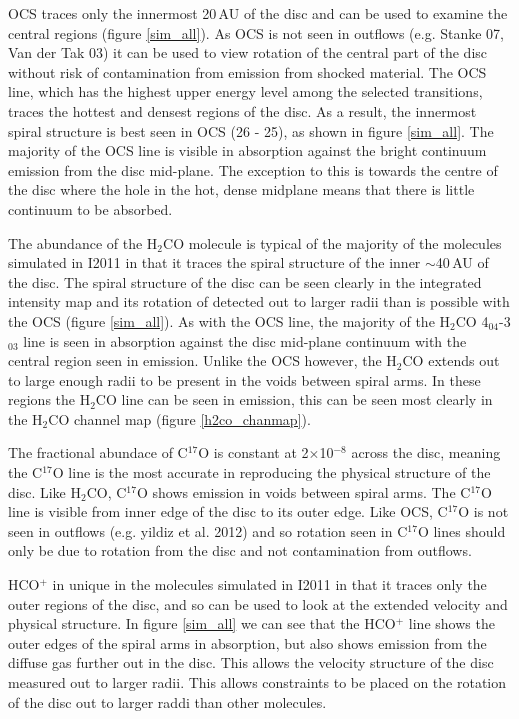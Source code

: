 \documentclass[useAMS,usenatbib]{mn2e}
\begin{document}
OCS traces only the innermost 20$\,$AU of the disc and can be used to examine the central regions (figure \ref{sim_all}). As OCS is not seen in outflows (e.g. Stanke 07, Van der Tak 03) it can be used to view rotation of the central part of the disc without risk of contamination from emission from shocked material. The OCS line, which has the highest upper energy level among the selected transitions, traces the hottest and densest regions of the disc. As a result, the innermost spiral structure is best seen in OCS (26 - 25), as shown in figure \ref{sim_all}. The majority of the OCS line is visible in absorption against the bright continuum emission from the disc mid-plane. The exception to this is towards the centre of the disc where the hole in the hot, dense midplane means that there is little continuum to be absorbed.\newline

The abundance of the H$_2$CO molecule is typical of the majority of the molecules simulated in I2011 in that it traces the spiral structure of the inner $\sim$40$\,$AU of the disc. The spiral structure of the disc can be seen clearly in the integrated intensity map and its rotation of detected out to larger radii than is possible with the OCS (figure \ref{sim_all}). As with the OCS line, the majority of the H$_2$CO 4$_{04}$-3$_{03}$ line is seen in absorption against the disc mid-plane continuum with the central region seen in emission. Unlike the OCS however, the H$_2$CO extends out to large enough radii to be present in the voids between spiral arms. In these regions the H$_2$CO line can be seen in emission, this can be seen most clearly in the H$_2$CO channel map (figure \ref{h2co_chanmap}).\newline

The fractional abundace of C$^{17}$O is constant at 2$\times$10$^{-8}$ across the disc, meaning the C$^{17}$O line is the most accurate in reproducing the physical structure of the disc. Like H$_2$CO, C$^{17}$O shows emission in voids between spiral arms. The C$^{17}$O line is visible from inner edge of the disc to its outer edge. Like OCS, C$^{17}$O is not seen in outflows (e.g. yildiz et al. 2012) and so rotation seen in C$^{17}$O lines should only be due to rotation from the disc and not contamination from outflows.\newline

HCO$^+$ in unique in the molecules simulated in I2011 in that it traces only the outer regions of the disc, and so can be used to look at the extended velocity and physical structure. In figure \ref{sim_all} we can see that the HCO$^+$ line shows the outer edges of the spiral arms in absorption, but also shows emission from the diffuse gas further out in the disc. This allows the velocity structure of the disc measured out to larger radii. This allows constraints to be placed on the rotation of the disc out to larger raddi than other molecules. 
\end{document}
